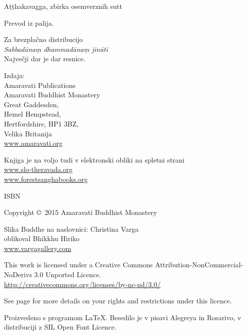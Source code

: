\cleartoverso

\thispagestyle{empty}

{\smaller\setlength{\parskip}{0.5em}\setlength{\parindent}{0em}%
{\raggedright

Aṭṭhakavagga, zbirka osemverznih sutt

Prevod iz palija.

Za brezplačno distribucijo\\
\emph{Sabbadānaṃ dhammadānaṃ jināti}\\
Največji dar je dar resnice.

Izdaja:\\
Amaravati Publications\\
Amaravati Buddhist Monastery\\
Great Gaddesden,\\
Hemel Hempstead,\\
Hertfordshire, HP1 3BZ,\\
Velika Britanija\\
\href{http://amaravati.org}{www.amaravati.org}

Knjiga je na voljo tudi v elektronski obliki na spletni strani\\
\href{http://slo-theravada.org}{www.slo-theravada.org}\\
\href{http://forestsanghabooks.org/}{www.forestsanghabooks.org}

ISBN \theISBN

Copyright \copyright\ 2015 Amaravati Buddhist Monastery

Slika Buddhe na naslovnici: Christina Varga\\
oblikoval Bhikkhu Hiriko\\
\href{http://vargagallery.com}{www.vargagallery.com}

\vfill

This work is licensed under a Creative Commons Attribution-NonCommercial-NoDerivs 3.0 Unported Licence.\\
\href{http://creativecommons.org/licenses/by-nc-nd/3.0/}{http://creativecommons.org/licenses/by-nc-nd/3.0/}

See page \pageref{copyright-details} for more details on your rights and restrictions under this licence.

Proizvedeno s programom {\selectfont\LaTeX}. Besedilo je v pisavi Alegreya in Rosarivo, v distribuciji z SIL Open Font Licence.

\theEditionInfo

\thePrintedByInfo

}}


